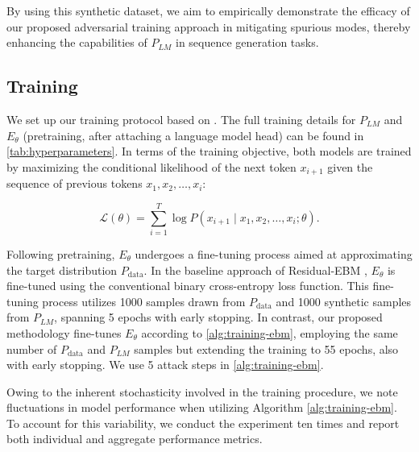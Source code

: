 \documentclass{article}
\begin{document}
By using this synthetic dataset, we aim to empirically demonstrate the efficacy of our proposed adversarial training approach in mitigating spurious modes, thereby enhancing the capabilities of \(P_{LM}\) in sequence generation tasks.
\subsection{Training}

We set up our training protocol based on  \cite{ResidualEBM2023}.
The full training details for \(P_{LM}\) and \(E_\theta\) (pretraining, after attaching a language model head) can be found in \cref{tab:hyperparameters}.
In terms of the training objective, both models are trained by maximizing the conditional likelihood of the next token \( x_{i+1} \) given the sequence of previous tokens \( x_1, x_2, \ldots, x_i \):

\begin{equation}
  \label{eq:seq_mle}
\mathcal{L}(\theta) = \sum_{i=1}^{T} \log P(x_{i+1} \mid x_1, x_2, \ldots, x_i; \theta).
\end{equation}


Following pretraining, \(E_\theta\) undergoes a fine-tuning process aimed at approximating the target distribution \(P_\text{data}\). In the baseline approach of Residual-EBM \citep{deng2019residual},  \(E_\theta\) is fine-tuned using the conventional binary cross-entropy loss function. This fine-tuning process utilizes 1000 samples drawn from \(P_\text{data}\) and 1000 synthetic samples from \(P_{LM}\), spanning 5 epochs with early stopping. In contrast, our proposed methodology fine-tunes \(E_\theta\) according to \cref{alg:training-ebm}, employing the same number of \(P_\text{data}\) and \(P_{LM}\) samples but extending the training to 55 epochs, also with early stopping.  We use 5 attack steps in \cref{alg:training-ebm}.

Owing to the inherent stochasticity involved in the training procedure, we note fluctuations in model performance when utilizing Algorithm \ref{alg:training-ebm}. To account for this variability, we conduct the experiment ten times and report both individual and aggregate performance metrics.
\end{document}
